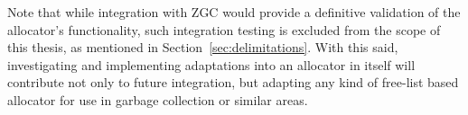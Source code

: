 
Note that while integration with ZGC would provide a definitive validation of the allocator's functionality, such integration testing is excluded from the scope of this thesis, as mentioned in Section~\ref{sec:delimitations}. With this said, investigating and implementing adaptations into an allocator in itself will contribute not only to future integration, but adapting any kind of free-list based allocator for use in garbage collection or similar areas.

